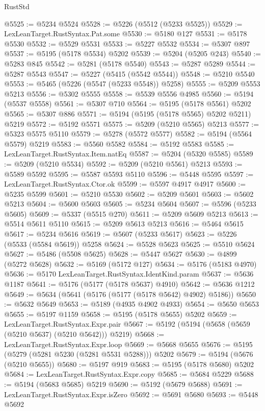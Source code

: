 \begin{lexlean}{RustStd}
\begin{coremodule}
@5525 := @5234 @5524
@5528 := @5226 (@5512 (@5233 @5525))
@5529 := LexLeanTarget.RustSyntax.Pat.some
@5530 := @5180 @127
@5531 := @5178 @5530
@5532 := @5529 @5531
@5533 := @5227 @5532
@5534 := @5307 @897
@5537 := @5195 (@5178 @5534) @5202
@5539 := @5204 (@5205 @243)
@5540 := @5283 @845
@5542 := @5281 (@5178 @5540)
@5543 := @5287 @5289
@5544 := @5287 @5543
@5547 := @5227 (@5415 (@5542 @5544))
@5548 := @5210 @5540
@5553 := @5465 (@5226 (@5547 (@5233 @5548)) @5258)
@5555 := @5209 @5553 @5213
@5556 := @5302 @5555
@5558 := @5539 @5556 @4985
@5560 := @5194 (@5537 @5558)
@5561 := @5307 @710
@5564 := @5195 (@5178 @5561) @5202
@5565 := @5307 @886
@5571 := @5194 (@5195 (@5178 @5565) @5202 @5211) @5219
@5572 := @5192 @5571
@5575 := @5209 (@5210 @5565) @5213
@5577 := @5323 @5575 @5110
@5579 := @5278 (@5572 @5577)
@5582 := @5194 (@5564 @5579) @5219
@5583 := @5560 @5582
@5584 := @5192 @5583
@5585 := LexLeanTarget.RustSyntax.Item.natEq
@5587 := @5204 (@5320 @5585)
@5589 := @5209 (@5210 @5534)
@5592 := @5209 (@5210 @5561) @5213
@5593 := @5589 @5592
@5595 := @5587 @5593 @5110
@5596 := @5448 @5595
@5597 := LexLeanTarget.RustSyntax.Ctor.ok
@5599 := @5597 @4917 @4917
@5600 := @5235 @5599
@5601 := @5210 @5530
@5602 := @5209 @5601
@5603 := @5602 @5213
@5604 := @5600 @5603
@5605 := @5234 @5604
@5607 := @5596 (@5233 @5605)
@5609 := @5337 (@5515 @270)
@5611 := @5209 @5609 @5213
@5613 := @5514 @5611 @5110
@5615 := @5209 @5613 @5213
@5616 := @5464 @5615
@5617 := @5234 @5616
@5619 := @5607 (@5233 @5617)
@5623 := @5226 (@5533 (@5584 @5619)) @5258
@5624 := @5528 @5623
@5625 := @5510 @5624
@5627 := @5486 (@5508 @5625)
@5628 := @5447 @5627
@5630 := @4899 (@5272 @5628)
@5632 := @5169 (@5172 @127)
@5634 := @5176 (@5183 @4970)
@5636 := @5170 LexLeanTarget.RustSyntax.IdentKind.param
@5637 := @5636 @1187
@5641 := @5176 (@5177 (@5178 @5637) @4910)
@5642 := @5636 @1212
@5649 := @5634 (@5641 (@5176 (@5177 (@5178 @5642) @4902) @5186))
@5650 := @5632 @5649
@5653 := @5189 (@4935 @4902 @4933)
@5654 := @5650 @5653
@5655 := @5197 @1159
@5658 := @5195 (@5178 @5655) @5202
@5659 := LexLeanTarget.RustSyntax.Expr.pair
@5667 := @5192 (@5194 (@5658 (@5659 (@5210 @5637) (@5210 @5642))) @5219)
@5668 := LexLeanTarget.RustSyntax.Expr.loop
@5669 := @5668 @5655
@5676 := @5195 (@5279 (@5281 @5230 (@5281 @5531 @5288))) @5202
@5679 := @5194 (@5676 (@5210 @5655))
@5680 := @5197 @919
@5683 := @5195 (@5178 @5680) @5202
@5684 := LexLeanTarget.RustSyntax.Expr.copy
@5685 := @5684 @5229
@5688 := @5194 (@5683 @5685) @5219
@5690 := @5192 (@5679 @5688)
@5691 := LexLeanTarget.RustSyntax.Expr.isZero
@5692 := @5691 @5680
@5693 := @5448 @5692

\end{coremodule}
\end{lexlean}
